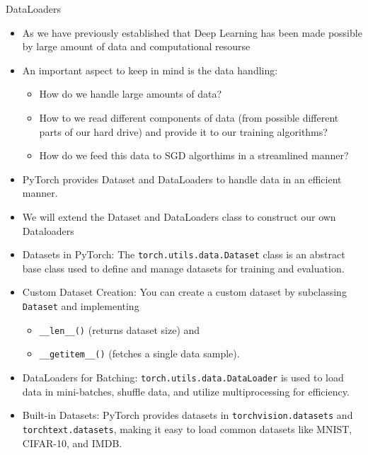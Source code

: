 \documentclass[10pt]{beamer}
\theoremstyle{remark}
\theoremstyle{definition}
\begin{document}
\begin{frame}[allowframebreaks]{DataLoaders}
\begin{itemize}
    \item As we have previously established that Deep Learning has been made possible by large amount of data and computational resourse
    \item An important aspect to keep in mind is the data handling:
    \begin{itemize}
        \item How do we handle large amounts of data?
        \item How to we read different components of data (from possible different parts of our hard drive) and provide it to our training algorithms?
        \item How do we feed this data to SGD algorthims in a streamlined manner?
    \end{itemize}

    \item PyTorch provides Dataset and DataLoaders to handle data in an efficient manner.
    \item We will extend the Dataset and DataLoaders class to construct our own Dataloaders


    
\end{itemize}
\framebreak

\begin{itemize}
    \item Datasets in PyTorch: The \texttt{torch.utils.data.Dataset} class is an abstract base class used to define and manage datasets for training and evaluation.
    \item Custom Dataset Creation: You can create a custom dataset by subclassing \texttt{Dataset} and implementing 
    \begin{itemize}
        \item  \texttt{\_\_len\_\_()} (returns dataset size) and 
        \item \texttt{\_\_getitem\_\_()} (fetches a single data sample).
    \end{itemize}
    
    \item DataLoaders for Batching: \texttt{torch.utils.data.DataLoader} is used to load data in mini-batches, shuffle data, and utilize multiprocessing for efficiency.
    \item Built-in Datasets: PyTorch provides datasets in \texttt{torchvision.datasets} and \texttt{torchtext.datasets}, making it easy to load common datasets like MNIST, CIFAR-10, and IMDB.
\
\end{itemize}


\end{frame}
\end{document}

